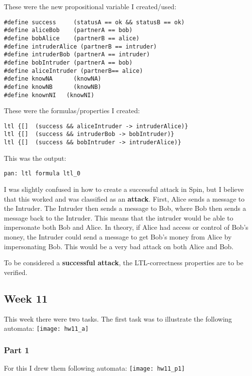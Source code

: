 \documentclass{article}
\theoremstyle{theorem}
\theoremstyle{definition}
\theoremstyle{remark}
\begin{document}
\noindent\newline These were the new propositional variable I created/used:
\begin{verbatim}
#define success		(statusA == ok && statusB == ok)
#define aliceBob	(partnerA == bob)
#define bobAlice	(partnerB == alice)
#define intruderAlice (partnerB == intruder)
#define intruderBob (partnerA == intruder)
#define bobIntruder (partnerA == bob)
#define aliceIntruder (partnerB== alice)
#define knowNA		(knowNA)
#define knowNB		(knowNB)
#define knownNI   (knowNI)
\end{verbatim}

\noindent\newline These were the formulas/properties I created:
\begin{verbatim}
ltl {[]  (success && aliceIntruder -> intruderAlice)}
ltl {[]  (success && intruderBob -> bobIntruder)}
ltl {[]  (success && bobIntruder -> intruderAlice)}
\end{verbatim}

\noindent\newline This was the output:
\begin{verbatim}
pan: ltl formula ltl_0
\end{verbatim}

\noindent\newline I was slightly confused in how to create a successful attack in Spin, but I believe that this worked and was classified as an \textbf{attack}. First, Alice sends a message to the Intruder. The Intruder then sends a message to Bob, where Bob then sends a message back to the Intruder. This means that the intruder would be able to impersonate both Bob and Alice. In theory, if Alice had access or control of Bob's money, the Intruder could send a message to get Bob's money from Alice by impersonating Bob. This would be a very bad attack on both Alice and Bob.


\noindent\newline To be considered a \textbf{successful attack}, the LTL-correctness properties are to be verified.

\subsection{Week 11}
This week there were two tasks. The first task was to illustrate the following automata:\newline
\texttt{[image: hw11\_a]}

\subsubsection{Part 1}
\noindent\newline For this I drew them following automata:\newline
\texttt{[image: hw11\_p1]}
\end{document}
